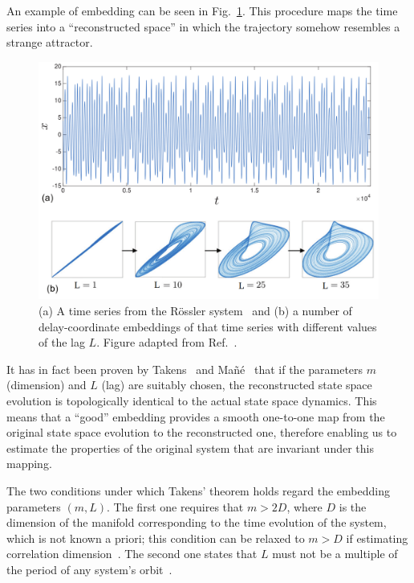 An example of embedding can be seen in Fig.~\ref{fig: rossler embedding}.
This procedure maps the time series into a ``reconstructed space'' in which the trajectory
somehow resembles a strange attractor.

\begin{figure}[!htbp]
    \centering
    \includegraphics[width=\linewidth]{images/rossler_embedding.png}
    \caption{
    (a) A time series from the R{\"o}ssler system~\cite{rossler1977continuous}
    and (b) a number of delay-coordinate embeddings of that time series with different values of the lag $L$.
    Figure adapted from Ref.~\cite{ref:bradley2015nonlinear}.}\label{fig: rossler embedding}
\end{figure}

It has in fact been proven by Takens~\cite{ref:takens2006detecting} and Ma{\~n}{\'e}~\cite{ref:mane2006dimension} that
if the parameters $m$ (dimension) and $L$ (lag) are suitably chosen,
the reconstructed state space evolution is topologically identical to the actual state space dynamics.
This means that a ``good” embedding provides a smooth one-to-one map from the
original state space evolution to the reconstructed one, therefore enabling us to estimate the
properties of the original system that are invariant under this mapping.

The two conditions under which Takens' theorem holds regard the embedding parameters $(m,L)$.
The first one requires that $m>2D$, where $D$ is the dimension of the manifold corresponding to the
time evolution of the system, which is not known a priori; this condition can be relaxed to $m>D$ if
estimating correlation dimension~\cite{ref:ding1993estimating}.
The second one states that $L$ must not be a multiple of the period of any system's
orbit~\cite{ref:grassberger1991nonlinear}.

